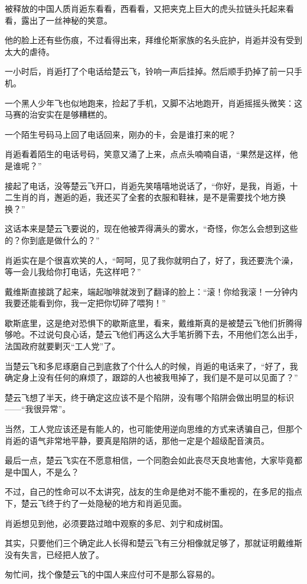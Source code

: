被释放的中国人质肖逅东看看，西看看，又把夹克上巨大的虎头拉链头托起来看看，露出了一丝神秘的笑意。

他的脸上还有些伤痕，不过看得出来，拜维伦斯家族的名头庇护，肖逅并没有受到太大的虐待。

一小时后，肖逅打了个电话给楚云飞，铃响一声后挂掉。然后顺手扔掉了前一只手机。

一个黑人少年飞也似地跑来，捡起了手机，又脚不沾地跑开，肖逅摇摇头微笑：这马赛的治安实在是够糟糕的。

一个陌生号码马上回了电话回来，刚办的卡，会是谁打来的呢？

肖逅看着陌生的电话号码，笑意又涌了上来，点点头喃喃自语，“果然是这样，他是谁呢？”

接起了电话，没等楚云飞开口，肖逅先笑嘻嘻地说话了，“你好，是我，肖逅，十二生肖的肖，邂逅的逅，我还买了全套的衣服和鞋袜，是不是需要找个地方换换？”

这话本来是楚云飞要说的，现在他被弄得满头的雾水，“奇怪，你怎么会想到这些的？你到底是做什么的？”

肖逅实在是个很喜欢笑的人，“呵呵，见了我你就明白了，好了，我还要洗个澡，等一会儿我给你打电话，先这样吧？”

戴维斯直接跳了起来，端起咖啡就泼到了翻译的脸上：“滚！你给我滚！一分钟内我要还能看到你，我一定把你切碎了喂狗！”

歇斯底里，这是绝对恐惧下的歇斯底里，看来，戴维斯真的是被楚云飞他们折腾得够呛。不过说句良心话，楚云飞他们再这么大手笔折腾下去，不用他们怎么出手，法国政府就要剿灭“工人党”了。

当楚云飞和多尼琢磨自己到底救了个什么人的时候，肖逅的电话来了，“好了，我确定身上没有任何的麻烦了，跟踪的人也被我甩掉了，我们是不是可以见面了？”

楚云飞想了半天，终于确定这应该不是个陷阱，没有哪个陷阱会做出明显的标识——“我很异常”。

当然，工人党应该还是有能人的，也可能使用逆向思维的方式来诱骗自己，但那个肖逅的语气非常地平静，要真是陷阱的话，那他一定是个超级配音演员。

最后一点，楚云飞实在不愿意相信，一个同胞会如此丧尽天良地害他，大家毕竟都是中国人，不是么？

不过，自己的性命可以不太讲究，战友的生命是绝对不能不重视的，在多尼的指点下，楚云飞终于约了一处隐秘的地方和肖逅见面。

肖逅想见到他，必须要路过暗中观察的多尼、刘宁和成树国。

其实，只要他们三个确定此人长得和楚云飞有三分相像就足够了，那就证明戴维斯没有失言，已经把人放了。

匆忙间，找个像楚云飞的中国人来应付可不是那么容易的。

